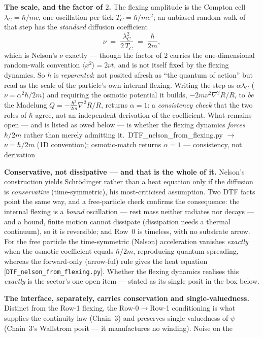 \documentclass[11pt]{article}
\newcommand{\pychip}[2]{{\footnotesize\colorbox{cbPyBg}{\ttfamily\,#1\,}\,{\color{gray}$\to$ #2}}}
\begin{document}
\textbf{The scale, and the factor of $2$.} The flexing amplitude is the Compton cell $\lambda_C=\hbar/mc$,
one oscillation per tick $T_C=\hbar/mc^2$; an unbiased random walk of that step has the \emph{standard}
diffusion coefficient
\[ \nu\;=\;\frac{\lambda_C^{2}}{2\,T_C}\;=\;\frac{\hbar}{2m}, \]
which is Nelson's $\nu$ exactly --- though the factor of $2$ carries the one-dimensional random-walk
convention $\langle x^2\rangle=2\nu t$, and is not itself fixed by the flexing dynamics. So $\hbar$ is
\emph{reparented}: not posited afresh as ``the quantum of action'' but read as the scale of the particle's
own internal flexing. Writing the step as $\alpha\lambda_C$ ($\nu=\alpha^2\hbar/2m$) and requiring the
osmotic potential it builds, $-2m\nu^2\nabla^2R/R$, to \emph{be} the Madelung $Q=-\tfrac{\hbar^2}{2m}\nabla^2R/R$,
returns $\alpha=1$: a \emph{consistency check} that the two roles of $\hbar$ agree, not an independent
derivation of the coefficient. What remains open --- and is listed as owed below --- is whether the flexing
dynamics \emph{forces} $\hbar/2m$ rather than merely admitting it.
\pychip{DTF\_nelson\_from\_flexing.py}{$\nu=\hbar/2m$ (1D convention); osmotic-match returns $\alpha{=}1$ --- consistency, not derivation}
\par\smallskip
\textbf{Conservative, not dissipative --- and that is the whole of it.} Nelson's construction yields
Schr\"odinger rather than a heat equation only if the diffusion is \emph{conservative} (time-symmetric),
his most-criticised assumption. Two DTF facts point the same way, and a free-particle check confirms the
consequence: the internal flexing is a \emph{bound} oscillation --- rest mass neither radiates nor decays
--- and a bound, finite motion cannot dissipate (dissipation needs a thermal continuum), so it is
reversible; and Row~0 is timeless, with no substrate arrow. For the free particle the time-symmetric
(Nelson) acceleration vanishes \emph{exactly} when the osmotic coefficient equals $\hbar/2m$, reproducing
quantum spreading, whereas the forward-only (arrow-ful) rule gives the heat equation
[\texttt{DTF\_nelson\_from\_flexing.py}]. Whether the flexing dynamics realises this \emph{exactly} is the
sector's one open item --- stated as its single posit in the box below.
\par\smallskip
\textbf{The interface, separately, carries conservation and single-valuedness.} Distinct from the Row-1
flexing, the Row-0$\to$Row-1 conditioning is what supplies the continuity law (Chain~3) and preserves
single-valuedness of $\psi$ (Chain~3's Wallstrom posit --- it manufactures no winding). Noise on the
\end{document}
